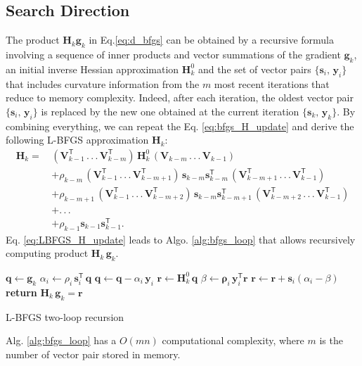 \subsection{Search Direction}
\label{sec:search_dir_qn}
The product $\mathbf{H}_k\mathbf{g}_k$ in Eq.\ref{eq:d_bfgs} can be obtained by a recursive formula involving a sequence of inner products and vector summations of the gradient $\mathbf{g}_k$, an initial inverse Hessian approximation $\mathbf{H}^0_k$ and the set of vector pairs $\{ \mathbf{s}_i, \, \mathbf{y}_i\}$ that includes curvature information from the $m$ most recent iterations that reduce to memory complexity. Indeed, after each iteration, the oldest vector pair $\{ \mathbf{s}_i, \, \mathbf{y}_i\}$ is replaced by the new one obtained at the current iteration $\{ \mathbf{s}_k, \, \mathbf{y}_k\}$. By combining everything, we can repeat the Eq. \ref{eq:bfgs_H_update} and derive the following L-BFGS approximation $\mathbf{H}_k$:
\begin{equation}
\begin{split}
     \mathbf{H}_k = \,&(\mathbf{V}_{k-1}^\mathsf{T}\, .\,.\,.\, \mathbf{V}_{k-m}^\mathsf{T})\,\mathbf{H}_k^0\,(\mathbf{V}_{k-m}\,.\,.\,.\, \mathbf{V}_{k-1})\\
    & + \rho_{k-m}\,(\mathbf{V}_{k-1}^\mathsf{T}\,.\,.\,.\,\mathbf{V}_{k-m+1}^\mathsf{T})\, \mathbf{s}_{k-m}\mathbf{s}_{k-m}^\mathsf{T} \, (\mathbf{V}_{k-m+1}^\mathsf{T}\,.\,.\,.\,\mathbf{V}_{k-1}^\mathsf{T})\\
    & + \rho_{k-m+1}\,(\mathbf{V}_{k-1}^\mathsf{T}\,.\,.\,.\,\mathbf{V}_{k-m+2}^\mathsf{T})\,\mathbf{s}_{k-m}\mathbf{s}_{k-m+1}^\mathsf{T} \,(\mathbf{V}_{k-m+2}^\mathsf{T}\,.\,.\,.\,\mathbf{V}_{k-1}^\mathsf{T})\\
    & + .\,.\,.\\
    & + \rho_{k-1}\mathbf{s}_{k-1}\mathbf{s}_{k-1}^\mathsf{T}.
\end{split}
\label{eq:LBFGS_H_update}
\end{equation}
Eq. \ref{eq:LBFGS_H_update} leads to Algo. \ref{alg:bfgs_loop} that allows recursively computing product $\mathbf{H}_k \, \mathbf{g}_k$.

\begin{algorithm}[H]
\label{alg:bfgs_loop}
\SetAlgoLined
 $\mathbf{q} \leftarrow \mathbf{g}_k$ \;
    {$\alpha_i \leftarrow \rho_i \, \mathbf{s}_i^\mathsf{T} \, \mathbf{q}$\;
    $\mathbf{q} \leftarrow \mathbf{q} - \alpha_i \, \mathbf{y}_i$\;} 
 \EndFor
 $\mathbf{r} \leftarrow \mathbf{H}_k^0 \, \mathbf{q}$\;
    {$\beta \leftarrow \boldsymbol\rho_i \, \mathbf{y}_i^\mathsf{T} \mathbf{r} $\;
    $\mathbf{r} \leftarrow \mathbf{r} + \mathbf{s}_i(\alpha_i - \beta)$\;} 
 \EndFor
 \textbf{return} $\mathbf{H}_k \, \mathbf{g}_k = \mathbf{r}$
 \caption{L-BFGS two-loop recursion}
\end{algorithm}
Alg. \ref{alg:bfgs_loop} has a $O(mn)$ computational complexity, where $m$ is the number of vector pair stored in memory.\\

